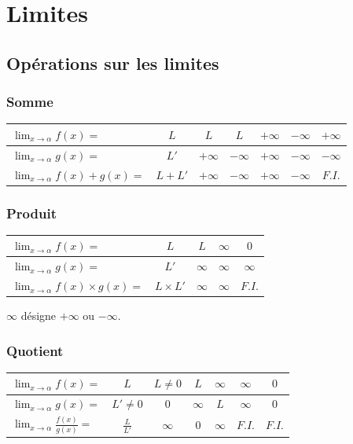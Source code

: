 \documentclass[12]{article}%
\theoremstyle{plain}
\theoremstyle{definition}
\theoremstyle{remark}
\begin{document}
\newpage
\section{Limites}

\subsection{Opérations sur les limites}
\subsubsection{Somme}
\begin{tabular}{|l|c|c|c|c|c|c|}
	\hline
	$\displaystyle \lim_{x \to \alpha} f(x) = $ & $L$ & $L$ & $L$ & $+\infty$ & $-\infty$ & $+\infty$ \\
	\hline
	$\displaystyle \lim_{x \to \alpha} g(x) = $ & $L'$ & $+\infty$ & $-\infty$ & $+\infty$ & $-\infty$ & $-\infty$ \\
	\hline
	$\displaystyle \lim_{x \to \alpha} f(x)+g(x) = $ & $L+L'$ & $+\infty$ & $-\infty$ & $+\infty$ & $-\infty$ & $F.I.$ \\
	\hline
\end{tabular}

\subsubsection{Produit}
\begin{tabular}{|l|c|c|c|c|}
	\hline
	$\displaystyle \lim_{x \to \alpha} f(x) = $ & $L$ & $L$ & $\infty$ & $0$ \\
	\hline
	$\displaystyle \lim_{x \to \alpha} g(x) = $ & $L'$ & $\infty$ & $\infty$ & $\infty$ \\
	\hline
	$\displaystyle \lim_{x \to \alpha} f(x) \times g(x) = $ & $L \times L'$ & $\infty$ & $\infty$ & $F.I.$ \\
	\hline
\end{tabular}

$\infty$ désigne $+\infty$ ou $-\infty$.

\subsubsection{Quotient}
\begin{tabular}{|l|c|c|c|c|c|c|}
	\hline
	$\displaystyle \lim_{x \to \alpha} f(x) = $ & $L$ & $L \ne 0$ & $L$ & $\infty$ & $\infty$ & $0$ \\
	\hline
	$\displaystyle \lim_{x \to \alpha} g(x) = $ & $L' \ne 0$ & $0$ & $\infty$ & $L$ & $\infty$ & $0$ \\
	\hline
	$\displaystyle \lim_{x \to \alpha} \frac{f(x)}{g(x)} = $ & $\frac{L}{L'}$ & $\infty$ & $0$ & $\infty$ & $F.I.$ & $F.I.$ \\
	\hline
\end{tabular}
	
\end{document}
